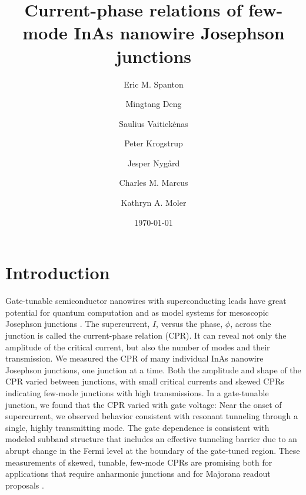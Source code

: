 \documentclass[11pt]{article}
\begin{document}
\title{Current-phase relations of few-mode InAs nanowire Josephson junctions}


\author[1,2]{Eric M. Spanton}
\author[3,4]{Mingtang Deng}
\author[3,5]{Saulius Vaitiek\.{e}nas}
\author[3]{Peter Krogstrup}
\author[3]{Jesper Nyg\aa rd}
\author[3]{Charles M. Marcus}
\author[1,2,6,*]{Kathryn A. Moler}

\renewcommand\Authands{ and }


\date{\today}%

\maketitle


\section{Introduction}


Gate-tunable semiconductor nanowires with superconducting leads have great potential for quantum computation  and as model systems for mesoscopic Josephson junctions  . The supercurrent, $I$, versus the phase, $\phi$, across the junction is called the current-phase relation (CPR). It can reveal not only the amplitude of the critical current, but also the number of modes and their transmission. We measured the CPR of many individual InAs nanowire Josephson junctions, one junction at a time. Both the amplitude and shape of the CPR varied between junctions, with small critical currents and skewed CPRs indicating few-mode junctions with high transmissions. In a gate-tunable junction, we found that the CPR varied with gate voltage: Near the onset of supercurrent, we observed behavior consistent with resonant tunneling through a single, highly transmitting mode. The gate dependence is consistent with modeled subband structure that includes an effective tunneling barrier due to an abrupt change in the Fermi level at the boundary of the gate-tuned region. These measurements of skewed, tunable, few-mode CPRs are promising both for applications that require anharmonic junctions  and for Majorana readout proposals .
\end{document}
